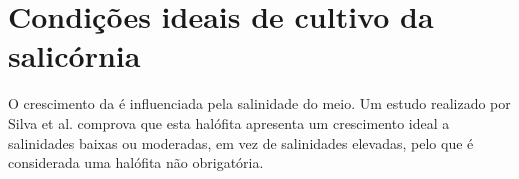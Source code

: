 \section{Condições ideais de cultivo da salicórnia}

O crescimento da \sr é influenciada pela salinidade do meio. Um estudo realizado por Silva et al.\cite{Silva2007} comprova que esta halófita apresenta um crescimento ideal a salinidades baixas ou moderadas, em vez de salinidades elevadas, pelo que é considerada uma halófita não obrigatória.













